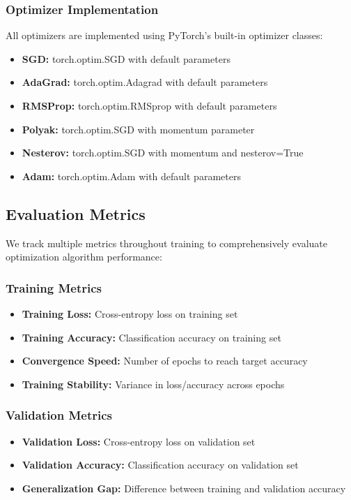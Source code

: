 \documentclass[12pt]{article}
\begin{document}
\subsubsection{Optimizer Implementation}
All optimizers are implemented using PyTorch's built-in optimizer classes:
\begin{itemize}
    \item \textbf{SGD:} torch.optim.SGD with default parameters
    \item \textbf{AdaGrad:} torch.optim.Adagrad with default parameters
    \item \textbf{RMSProp:} torch.optim.RMSprop with default parameters
    \item \textbf{Polyak:} torch.optim.SGD with momentum parameter
    \item \textbf{Nesterov:} torch.optim.SGD with momentum and nesterov=True
    \item \textbf{Adam:} torch.optim.Adam with default parameters
\end{itemize}

\subsection{Evaluation Metrics}

We track multiple metrics throughout training to comprehensively evaluate optimization algorithm performance:

\subsubsection{Training Metrics}
\begin{itemize}
    \item \textbf{Training Loss:} Cross-entropy loss on training set
    \item \textbf{Training Accuracy:} Classification accuracy on training set
    \item \textbf{Convergence Speed:} Number of epochs to reach target accuracy
    \item \textbf{Training Stability:} Variance in loss/accuracy across epochs
\end{itemize}

\subsubsection{Validation Metrics}
\begin{itemize}
    \item \textbf{Validation Loss:} Cross-entropy loss on validation set
    \item \textbf{Validation Accuracy:} Classification accuracy on validation set
    \item \textbf{Generalization Gap:} Difference between training and validation accuracy
\end{itemize}
\end{document}

